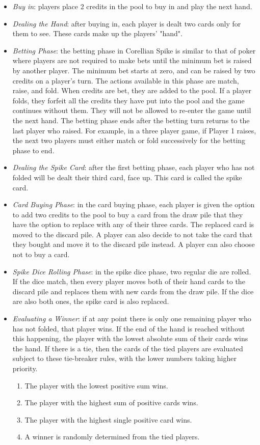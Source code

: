 \documentclass{article}
\begin{document}
\begin{itemize}
\item \textit{Buy in}: players place 2 credits in the pool to buy in and play the next hand. 
\item \textit{Dealing the Hand}: after buying in, each player is dealt two cards only for them to see. These cards make up the players' "hand".
\item \textit{Betting Phase}: the betting phase in Corellian Spike is similar to that of poker where players are not required to make bets until the minimum bet is raised by another player. The minimum bet starts at zero, and can be raised by two credits on a player's turn. The actions available in this phase are match, raise, and fold. When credits are bet, they are added to the pool. If a player folds, they forfeit all the credits they have put into the pool and the game continues without them. They will not be allowed to re-enter the game until the next hand. The betting phase ends after the betting turn returns to the last player who raised. For example, in a three player game, if Player 1 raises, the next two players must either match or fold successively for the betting phase to end. 
\item \textit{Dealing the Spike Card}: after the first betting phase, each player who has not folded will be dealt their third card, face up. This card is called the spike card. 
\item \textit{Card Buying Phase}: in the card buying phase, each player is given the option to add two credits to the pool to buy a card from the draw pile that they have the option to replace with any of their three cards. The replaced card is moved to the discard pile. A player can also decide to not take the card that they bought and move it to the discard pile instead. A player can also choose not to buy a card.
\item \textit{Spike Dice Rolling Phase}: in the spike dice phase, two regular die are rolled. If the dice match, then every player moves both of their hand cards to the discard pile and replaces them with new cards from the draw pile. If the dice are also both ones, the spike card is also replaced.
\item \textit{Evaluating a Winner}: if at any point there is only one remaining player who has not folded, that player wins. If the end of the hand is reached without this happening, the player with the lowest absolute sum of their cards wins the hand. If there is a tie, then the cards of the tied players are evaluated subject to these tie-breaker rules, with the lower numbers taking higher priority. 
\begin{enumerate}
    \item The player with the lowest positive sum wins. 
    \item The player with the highest sum of positive cards wins. 
    \item The player with the highest single positive card wins. 
    \item A winner is randomly determined from the tied players.
\end{enumerate}
\end{itemize}
\end{document}
